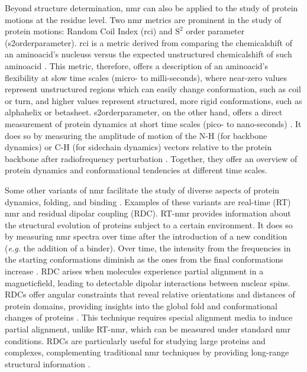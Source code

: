 Beyond structure determination, \gls{nmr} can also be applied to the study of protein motions at the residue level. Two \gls{nmr} metrics are prominent in the study of protein motions: Random Coil Index (\gls{rci}) and $\text{S}^{2}$ order parameter (\gls{s2orderparameter}). \gls{rci} is a metric derived from comparing the \gls{chemicalshift} of an \gls{aminoacid}'s \glspl{nucleus} versus the expected unstructured \gls{chemicalshift} of such \gls{aminoacid} \cite{schwarzinger_random_2000}. This metric, therefore, offers a description of an \gls{aminoacid}'s \gls{flexibility} at slow time scales (micro- to milli-seconds), where near-zero values represent unstructured regions which can easily change \gls{conformation}, such as coil or turn, and higher values represent structured, more rigid \glspl{conformation}, such as \gls{alphahelix} or \gls{betasheet}. \gls{s2orderparameter}, on the other hand, offers a direct measurement of protein \gls{dynamics} at short time scales (pico- to nano-seconds) \cite{sapienza_using_2010}. It does so by measuring the amplitude of motion of the N-H (for \gls{backbone} dynamics) or C-H (for \gls{sidechain} dynamics) vectors relative to the protein \gls{backbone} after \gls{radiofrequency} perturbation \cite{sapienza_using_2010, smith_use_2021}. Together, they offer an overview of protein \gls{dynamics} and conformational tendencies at different time scales.


Some other variants of \gls{nmr} facilitate the study of diverse aspects of protein \gls{dynamics}, folding, and binding \cite{kleckner_introduction_2011}. Examples of these variants are real-time (RT) \gls{nmr} and residual dipolar coupling (RDC). 
RT-\gls{nmr} provides information about the structural evolution of proteins subject to a certain environment. It does so by measuring \gls{nmr} spectra over time after the introduction of a new condition (\textit{e.g.} the addition of a binder). Over time, the intensity from the frequencies in the starting \glspl{conformation} diminish as the ones from the final \glspl{conformation} increase \cite{zeeb_protein_2004}. 
RDC arises when molecules experience partial alignment in a \gls{magneticfield}, leading to detectable dipolar interactions between nuclear spins. RDCs offer angular constraints that reveal relative orientations and distances of protein domains, providing insights into the global fold and conformational changes of proteins \cite{tolman_nmr_2006}. This technique requires special alignment media to induce partial alignment, unlike RT-\gls{nmr}, which can be measured under standard \gls{nmr} conditions. RDCs are particularly useful for studying large proteins and complexes, complementing traditional \gls{nmr} techniques by providing long-range structural information \cite{tolman_novel_2002, bax_weak_2003}.

